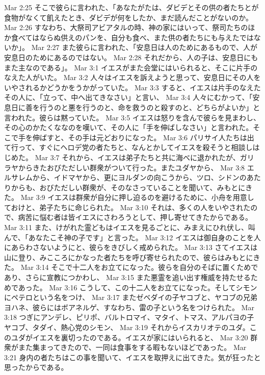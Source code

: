 Mar 2:25  そこで彼らに言われた、「あなたがたは、ダビデとその供の者たちとが食物がなくて飢えたとき、ダビデが何をしたか、まだ読んだことがないのか。
Mar 2:26  すなわち、大祭司アビアタルの時、神の家にはいって、祭司たちのほか食べてはならぬ供えのパンを、自分も食べ、また供の者たちにも与えたではないか」。
Mar 2:27  また彼らに言われた、「安息日は人のためにあるもので、人が安息日のためにあるのではない。
Mar 2:28  それだから、人の子は、安息日にもまた主なのである」。
Mar 3:1  イエスがまた会堂にはいられると、そこに片手のなえた人がいた。
Mar 3:2  人々はイエスを訴えようと思って、安息日にその人をいやされるかどうかをうかがっていた。
Mar 3:3  すると、イエスは片手のなえたその人に、「立って、中へ出てきなさい」と言い、
Mar 3:4  人々にむかって、「安息日に善を行うのと悪を行うのと、命を救うのと殺すのと、どちらがよいか」と言われた。彼らは黙っていた。
Mar 3:5  イエスは怒りを含んで彼らを見まわし、その心のかたくななのを嘆いて、その人に「手を伸ばしなさい」と言われた。そこで手を伸ばすと、その手は元どおりになった。
Mar 3:6  パリサイ人たちは出て行って、すぐにヘロデ党の者たちと、なんとかしてイエスを殺そうと相談しはじめた。
Mar 3:7  それから、イエスは弟子たちと共に海べに退かれたが、ガリラヤからきたおびただしい群衆がついて行った。またユダヤから、
Mar 3:8  エルサレムから、イドマヤから、更にヨルダンの向こうから、ツロ、シドンのあたりからも、おびただしい群衆が、そのなさっていることを聞いて、みもとにきた。
Mar 3:9  イエスは群衆が自分に押し迫るのを避けるために、小舟を用意しておけと、弟子たちに命じられた。
Mar 3:10  それは、多くの人をいやされたので、病苦に悩む者は皆イエスにさわろうとして、押し寄せてきたからである。
Mar 3:11  また、けがれた霊どもはイエスを見るごとに、みまえにひれ伏し、叫んで、「あなたこそ神の子です」と言った。
Mar 3:12  イエスは御自身のことを人にあらわさないようにと、彼らをきびしく戒められた。
Mar 3:13  さてイエスは山に登り、みこころにかなった者たちを呼び寄せられたので、彼らはみもとにきた。
Mar 3:14  そこで十二人をお立てになった。彼らを自分のそばに置くためであり、さらに宣教につかわし、
Mar 3:15  また悪霊を追い出す権威を持たせるためであった。
Mar 3:16  こうして、この十二人をお立てになった。そしてシモンにペテロという名をつけ、
Mar 3:17  またゼベダイの子ヤコブと、ヤコブの兄弟ヨハネ、彼らにはボアネルゲ、すなわち、雷の子という名をつけられた。
Mar 3:18  つぎにアンデレ、ピリポ、バルトロマイ、マタイ、トマス、アルパヨの子ヤコブ、タダイ、熱心党のシモン、
Mar 3:19  それからイスカリオテのユダ。このユダがイエスを裏切ったのである。イエスが家にはいられると、
Mar 3:20  群衆がまた集まってきたので、一同は食事をする暇もないほどであった。
Mar 3:21  身内の者たちはこの事を聞いて、イエスを取押えに出てきた。気が狂ったと思ったからである。
